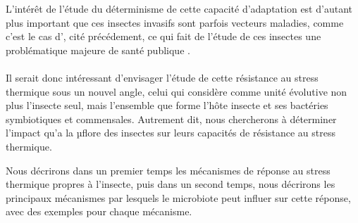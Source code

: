 
L'intérêt de l'étude du déterminisme de cette capacité d'adaptation est
d'autant plus important que ces insectes invasifs sont parfois vecteurs
maladies, comme c'est le cas d', cité précédement, ce
qui fait de l'étude de ces insectes une problématique majeure de santé
publique \cite{schaffner2013}.



\paragraph{} %
\label{par:intro3}

Il serait donc intéressant d'envisager l'étude de cette résistance au stress
thermique sous un nouvel angle, celui qui considère comme unité évolutive non
plus l'insecte seul, mais l'ensemble que forme l'hôte insecte et ses bactéries
symbiotiques et commensales. Autrement dit, nous chercherons à déterminer
l'impact qu'a la µflore des insectes sur leurs capacités de résistance au
stress thermique.

Nous décrirons dans un premier temps les mécanismes de réponse au stress
thermique propres à l'insecte, puis dans un second temps, 
nous décrirons les principaux mécanismes par lesquels le microbiote peut influer sur cette réponse, avec des exemples pour chaque mécanisme.


